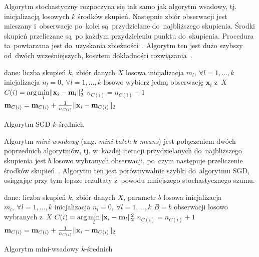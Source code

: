 \documentclass{praca1}
\DeclarePairedDelimiter{\norm}{\lVert}{\rVert}
\begin{document}
Algorytm stochastyczny rozpoczyna się tak samo jak algorytm wsadowy, tj. inicjalizacją losowych $k$ środków skupień. Następnie zbiór obserwacji jest mieszany i~obserwacje po~kolei są~przydzielane do~najbliższego skupienia. Środki skupień przeliczane są~po każdym przydzieleniu punktu do~skupienia. Procedura ta~powtarzana jest do~uzyskania zbieżności~\cite{Bottou1995:convergenceproperties}. Algorytm ten jest dużo szybszy od~dwóch wcześniejszych, kosztem dokładności rozwiązania~\cite{Bottou2012:sgdtricks}.

\begin{algorithm}[h!]
\begin{algorithmic}[1]
		\State dane: liczba skupień $k$, zbiór danych $X$
        \State losowa inicjalizacja $m_l, \ \forall l=1, ..., k$
        \State inicjalizacja $n_l = 0, \ \forall l=1, \ldots, k$
        \Repeat
        	\State losowo wybierz jedną obserwację $\mathbf{x}_i$ z~$X$
                \State $C(i) = \arg \min\limits_{l} \norm{\mathbf{x}_i - \mathbf{m}_l }_2^2 $
                \State $n_{C(i)} = n_{C(i)} + 1$
                \State $\mathbf{m}_{C(i)} = \mathbf{m}_{C(i)} + \frac{1}{n_{C(i)}}\norm{\mathbf{x}_i - \mathbf{m}_{C(i)}}_2$
\end{algorithmic}
\caption{Algorytm SGD $k$-średnich}\label{alg:002}
\end{algorithm}

Algorytm \emph{mini-wsadowy} (ang. \emph{mini-batch $k$-means}) jest połączeniem dwóch poprzednich algorytmów, tj. w~każdej iteracji przydzielanych do~najbliższego skupienia jest $b$ losowo wybranych obserwacji, po~czym następuje przeliczenie środków skupień~\cite{Sculley2010:webkmeans}. Algorytm ten jest porównywalnie szybki do~algorytmu SGD, osiągając przy tym lepsze rezultaty z~powodu mniejszego stochastycznego szumu.

\begin{algorithm}[h!]
\begin{algorithmic}[1]
		\State dane: liczba skupień $k$, zbiór danych $X$, parametr $b$
        \State losowa inicjalizacja $m_l, \ \forall l=1, ..., k$
        \State inicjalizacja $n_l = 0, \ \forall l=1, ..., k$
        \Repeat
        	\State $B = b$ obserwacji losowo wybranych z~$X$
                \State $C(i) = \arg \min\limits_{l} \norm{\mathbf{x}_i - \mathbf{m}_l }_2^2 $
            \EndFor
                \State $n_{C(i)} = n_{C(i)} + 1$
                \State $\mathbf{m}_{C(i)} = \mathbf{m}_{C(i)} + \frac{1}{n_{C(i)}}\norm{\mathbf{x}_i - \mathbf{m}_{C(i)}}_2$
            \EndFor
\end{algorithmic}
\caption{Algorytm mini-wsadowy $k$-średnich}\label{alg:003}
\end{algorithm}
\end{document}
